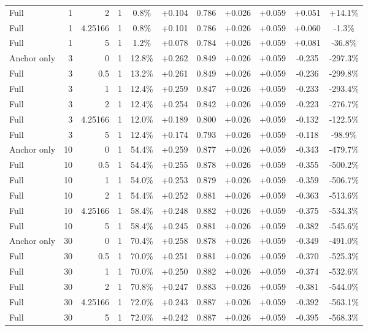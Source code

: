 \begin{table}[htbp]
\begin{tabular}{lrrrccccccc}
Full & 1 & 2 & 1 & 0.8\% & +0.104 & 0.786 & +0.026 & +0.059 & +0.051 & +14.1\% \\
Full & 1 & 4.25166 & 1 & 0.8\% & +0.101 & 0.786 & +0.026 & +0.059 & +0.060 & -1.3\% \\
Full & 1 & 5 & 1 & 1.2\% & +0.078 & 0.784 & +0.026 & +0.059 & +0.081 & -36.8\% \\
Anchor only & 3 & 0 & 1 & 12.8\% & +0.262 & 0.849 & +0.026 & +0.059 & -0.235 & -297.3\% \\
Full & 3 & 0.5 & 1 & 13.2\% & +0.261 & 0.849 & +0.026 & +0.059 & -0.236 & -299.8\% \\
Full & 3 & 1 & 1 & 12.4\% & +0.259 & 0.847 & +0.026 & +0.059 & -0.233 & -293.4\% \\
Full & 3 & 2 & 1 & 12.4\% & +0.254 & 0.842 & +0.026 & +0.059 & -0.223 & -276.7\% \\
Full & 3 & 4.25166 & 1 & 12.0\% & +0.189 & 0.800 & +0.026 & +0.059 & -0.132 & -122.5\% \\
Full & 3 & 5 & 1 & 12.4\% & +0.174 & 0.793 & +0.026 & +0.059 & -0.118 & -98.9\% \\
Anchor only & 10 & 0 & 1 & 54.4\% & +0.259 & 0.877 & +0.026 & +0.059 & -0.343 & -479.7\% \\
Full & 10 & 0.5 & 1 & 54.4\% & +0.255 & 0.878 & +0.026 & +0.059 & -0.355 & -500.2\% \\
Full & 10 & 1 & 1 & 54.0\% & +0.253 & 0.879 & +0.026 & +0.059 & -0.359 & -506.7\% \\
Full & 10 & 2 & 1 & 54.4\% & +0.252 & 0.881 & +0.026 & +0.059 & -0.363 & -513.6\% \\
Full & 10 & 4.25166 & 1 & 58.4\% & +0.248 & 0.882 & +0.026 & +0.059 & -0.375 & -534.3\% \\
Full & 10 & 5 & 1 & 58.4\% & +0.245 & 0.881 & +0.026 & +0.059 & -0.382 & -545.6\% \\
Anchor only & 30 & 0 & 1 & 70.4\% & +0.258 & 0.878 & +0.026 & +0.059 & -0.349 & -491.0\% \\
Full & 30 & 0.5 & 1 & 70.0\% & +0.251 & 0.881 & +0.026 & +0.059 & -0.370 & -525.3\% \\
Full & 30 & 1 & 1 & 70.0\% & +0.250 & 0.882 & +0.026 & +0.059 & -0.374 & -532.6\% \\
Full & 30 & 2 & 1 & 70.8\% & +0.247 & 0.883 & +0.026 & +0.059 & -0.381 & -544.0\% \\
Full & 30 & 4.25166 & 1 & 72.0\% & +0.243 & 0.887 & +0.026 & +0.059 & -0.392 & -563.1\% \\
Full & 30 & 5 & 1 & 72.0\% & +0.242 & 0.887 & +0.026 & +0.059 & -0.395 & -568.3\% \\

\end{tabular}
\end{table}
